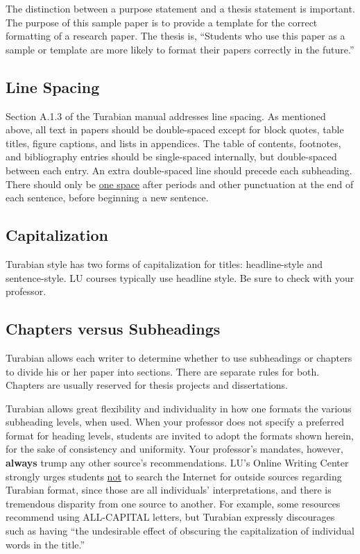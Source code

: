 \documentclass[raggedright]{turabian-researchpaper}
\begin{document}
The distinction between a purpose statement and a thesis statement is important.
The purpose of this sample paper is to provide a template for the correct
formatting of a research paper. The thesis is, ``Students who use this paper as
a sample or template are more likely to format their papers correctly in the
future.''

\subsection{Line Spacing}

Section A.1.3 of the Turabian manual addresses line
spacing.\autocite[373]{Turabian} As mentioned above, all text in papers should
be double-spaced except for block quotes, table titles, figure captions, and
lists in appendices. The table of contents, footnotes, and bibliography entries
should be single-spaced internally, but double-spaced between each
entry.\autocite[373]{Turabian} An extra double-spaced line should precede each
subheading. There should only be \underline{one space} after periods and other
punctuation at the end of each sentence, before beginning a new
sentence.\autocite[373]{Turabian}

\subsection{Capitalization}

Turabian style has two forms of capitalization for titles: headline-style and
sentence-style.\autocite[312]{Turabian} LU courses typically use headline style.
Be sure to check with your professor.

\subsection{Chapters versus Subheadings}

Turabian allows each writer to determine whether to use subheadings or chapters
to divide his or her paper into sections. There are separate rules for both.
Chapters are usually reserved for thesis projects and dissertations.

Turabian allows great flexibility and individuality in how one formats the
various subheading levels, when used. When your professor does not specify a
preferred format for heading levels, students are invited to adopt the formats
shown herein, for the sake of consistency and uniformity. Your professor's
mandates, however, \textbf{always} trump any other source's recommendations.
LU's Online Writing Center strongly urges students \underline{not} to search the
Internet for outside sources regarding Turabian format, since those are all
individuals' interpretations, and there is tremendous disparity from one source
to another. For example, some resources recommend using ALL-CAPITAL letters, but
Turabian expressly discourages such as having ``the undesirable effect of
obscuring the capitalization of individual words in the
title.''\autocite[375]{Turabian}
\end{document}
